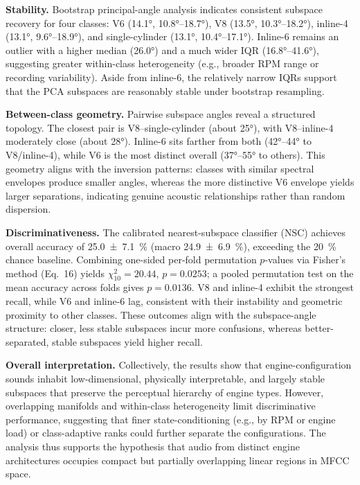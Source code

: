 \documentclass[11pt]{article}
\newcommand{\NSC}{NSC\xspace}
\begin{document}
\textbf{Stability.}
Bootstrap principal-angle analysis indicates consistent subspace recovery for four classes: V6 (\ang{14.1}, \ang{10.8}–\ang{18.7}), V8 (\ang{13.5}, \ang{10.3}–\ang{18.2}), inline-4 (\ang{13.1}, \ang{9.6}–\ang{18.9}), and single-cylinder (\ang{13.1}, \ang{10.4}–\ang{17.1}). 
Inline-6 remains an outlier with a higher median (\ang{26.0}) and a much wider IQR (\ang{16.8}–\ang{41.6}), suggesting greater within-class heterogeneity (e.g., broader RPM range or recording variability). 
Aside from inline-6, the relatively narrow IQRs support that the PCA subspaces are reasonably stable under bootstrap resampling.

\textbf{Between-class geometry.}
Pairwise subspace angles reveal a structured topology.
The closest pair is V8--single-cylinder (about \ang{25}), with V8--inline-4 moderately close (about \ang{28}).
Inline-6 sits farther from both (\ang{42}--\ang{44} to V8/inline-4), while V6 is the most distinct overall (\ang{37}--\ang{55} to others).
This geometry aligns with the inversion patterns: classes with similar spectral envelopes produce smaller angles, whereas the more distinctive V6 envelope yields larger separations, indicating genuine acoustic relationships rather than random dispersion.

\textbf{Discriminativeness.}
The calibrated nearest-subspace classifier (\NSC) achieves overall accuracy of \SI{25.0 \pm 7.1}{\percent} (macro \SI{24.9 \pm 6.9}{\percent}), exceeding the \SI{20}{\percent} chance baseline. Combining one-sided per-fold permutation $p$-values via Fisher's method (Eq.~16) yields $\chi^2_{10}=20.44$, $p=0.0253$; a pooled permutation test on the mean accuracy across folds gives $p=0.0136$. 
V8 and inline-4 exhibit the strongest recall, while V6 and inline-6 lag, consistent with their instability and geometric proximity to other classes. 
These outcomes align with the subspace-angle structure: closer, less stable subspaces incur more confusions, whereas better-separated, stable subspaces yield higher recall.

\textbf{Overall interpretation.}  
Collectively, the results show that engine-configuration sounds inhabit low-dimensional, physically interpretable, and largely stable subspaces that preserve the perceptual hierarchy of engine types.  
However, overlapping manifolds and within-class heterogeneity limit discriminative performance, suggesting that finer state-conditioning (e.g., by RPM or engine load) or class-adaptive ranks could further separate the configurations.  
The analysis thus supports the hypothesis that audio from distinct engine architectures occupies compact but partially overlapping linear regions in MFCC space.
\end{document}
